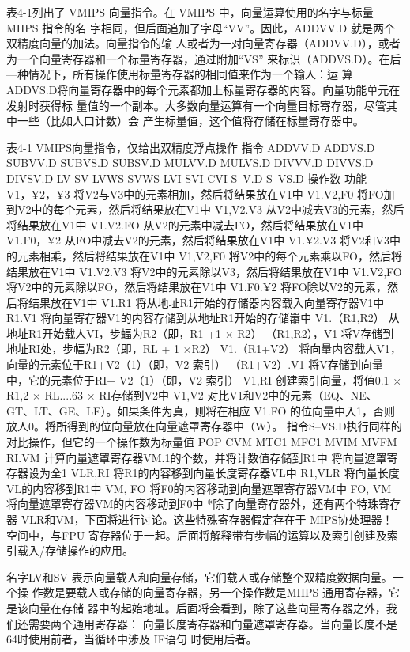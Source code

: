 表4-1列出了 VMIPS 向量指令。在 VMIPS 中，向量运算使用的名字与标量 MIIPS 指令的名
字相同，但后面追加了字母“VV”。因此，ADDVV.D 就是两个双精度向量的加法。向量指令的输
人或者为一对向量寄存器（ADDVV.D），或者为一个向量寄存器和一个标量寄存器，通过附加“VS”
来标识（ADDVS.D）。在后—种情况下，所有操作使用标量寄存器的相同值来作为一个输人：运
算 ADDVS.D将向量寄存器中的每个元素都加上标量寄存器的内容。向量功能单元在发射时获得标
量值的一个副本。大多数向量运算有一个向量目标寄存器，尽管其中一些（比如人口计数）会
产生标量值，这个值将存储在标量寄存器中。

表4-1 VMIPS向量指令，仅给出双精度浮点操作
指令
ADDVV.D
ADDVS.D
SUBVV.D
SUBVS.D
SUBSV.D
MULVV.D
MULVS.D
DIVVV.D
DIVVS.D
DIVSV.D
LV
SV
LVWS
SVWS
LVI
SVI
CVI
S--V.D
S--VS.D
操作数
功能
V1，¥2，¥3
将V2与V3中的元素相加，然后将结果放在V1中
V1.V2,F0
将FO加到V2中的每个元素，然后将结果放在V1中
V1,V2.V3
从V2中减去V3的元素，然后将结果放在V1中
V1.V2.FO
从V2的元素中减去FO，然后将结果放在V1中
V1.F0，¥2
从FO中减去V2的元素，然后将结果放在V1中
V1.¥2.V3
将V2和V3中的元素相乘，然后将结果放在V1中
V1,V2,F0
将V2中的每个元素乘以FO，然后将结果放在V1中
V1.V2.V3
将V2中的元素除以V3，然后将结果放在V1中
V1.V2,FO
将V2中的元素除以FO，然后将结果放在V1中
V1.F0.¥2
将FO除以V2的元素，然后将结果放在V1中
V1.R1
将从地址R1开始的存储器内容载入向量寄存器V1中
R1.V1
将向量寄存器V1的内容存储到从地址R1开始的存储嚣中
V1.（R1,R2）
从地址R1开始载人VI，步蝠为R2（即，R1 +1 × R2）
（R1,R2），V1
将V存储到地址RI处，步幅为R2（即，RL + 1 ×R2）
V1.（R1+V2）
将向量内容载人V1，向量的元素位于R1+V2（1）（即，V2 索引）
（R1+V2）.V1
将V存储到向量中，它的元素位于RI+ V2（1）（即，V2 索引）
V1,RI
创建索引向量，将值0.1 × R1,2 × RL....63 × RI存储到V2中
V1,V2
对比V1和V2中的元素（EQ、NE、GT、LT、GE、LE）。如果条件为真，则将在相应
V1.FO
的位向量中入1，否则放人0。将所得到的位向量放在向量遮罩寄存器中（W）。
指令S--VS.D执行同样的对比操作，但它的一个操作数为标量值
POP
CVM
MTC1
MFC1
MVIM
MVFM
RI.VM
计算向量遮罩寄存器VM.1的个数，并将计数值存储到R1中
将向量遮罩寄存器设为全1
VLR,RI
将R1的内容移到向量长度寄存器VL中
R1,VLR
将向量长度VL的内容移到R1中
VM, FO
将F0的内容移动到向量遮罩寄存器VM中
FO, VM
将向量遮罩寄存器VM的内容移动到F0中
*除了向量寄存器外，还有两个特珠寄存器 VLR和VM，下面将进行讨论。这些特殊寄存器假定存在于 MIPS协处理器！
空间中，与FPU 寄存器位于一起。后面将解释带有步幅的运算以及索引创建及索引载入/存储操作的应用。

名字LV和SV 表示向量载人和向量存储，它们载人或存储整个双精度数据向量。一个操
作数是要载人或存储的向量寄存器，另一个操作数是MIIPS 通用寄存器，它是该向量在存储
器中的起始地址。后面将会看到，除了这些向量寄存器之外，我们还需要两个通用寄存器：
向量长度寄存器和向量遮罩寄存器。当向量长度不是64时使用前者，当循环中涉及 IF语句
时使用后者。

